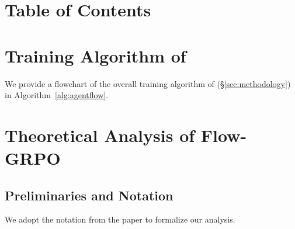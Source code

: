 \appendix

\renewcommand*\footnoterule{} %

\newcommand\blfootnote[1]{%
  \begingroup
  \renewcommand\thefootnote{}\footnote{#1}%
  \addtocounter{footnote}{-1}%
  \endgroup
}

\section*{Table of Contents}
\setcounter{tocdepth}{2}
\renewcommand{\contentsname}{Appendix Contents}
\startcontents[appendix]  %





\clearpage
\section{Training Algorithm of \model}
\label{app:details_of_model}


We provide a flowchart of the overall training algorithm of \model (\S\ref{sec:methodology}) in Algorithm~\ref{alg:agentflow}.



\clearpage
\section{Theoretical Analysis of Flow-GRPO}
\label{app:mathematical_analysis}
\subsection{Preliminaries and Notation}

We adopt the notation from the paper to formalize our analysis.

